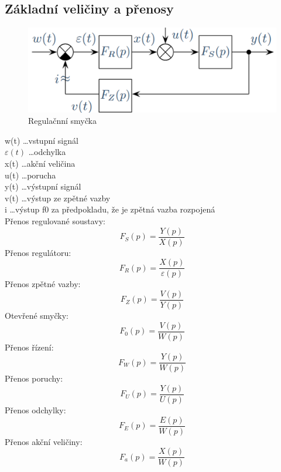 \subsection*{Základní veličiny a přenosy}
\begin{figure}[H]
    \includegraphics[scale = 0.45]{images/reg.soustava2.png}
    \caption{Regulačnní smyčka}
\end{figure}
w(t) \dots vstupní signál \\
$\varepsilon(t)$ \dots odchylka \\
x(t) \dots akční veličina \\
u(t) \dots porucha \\
y(t) \dots výstupní signál\\
v(t) \dots výstup ze zpětné vazby\\
i    \dots výstup f0 za předpokladu, že je zpětná vazba rozpojená\\

\noindent
Přenos regulované soustavy:
\begin{equation}
    F_S(p) = \frac{Y(p)}{X(p)}
\end{equation}
Přenos regulátoru:
\begin{equation}
    F_R(p) = \frac{X(p)}{\varepsilon(p)}
\end{equation}
Přenos zpětné vazby:
\begin{equation}
    F_Z(p) = \frac{V(p)}{Y(p)}
\end{equation}
Otevřené smyčky:
\begin{equation}
    F_0(p) = \frac{V(p)}{W(p)} %
\end{equation}
Přenos řízení:
\begin{equation}
    F_W(p) = \frac{Y(p)}{W(p)}
\end{equation}
Přenos poruchy:
\begin{equation}
    F_U(p) = \frac{Y(p)}{U(p)}
\end{equation}
Přenos odchylky:
\begin{equation}
    F_E(p)=\frac{E(p)}{W(p)}
\end{equation}
Přenos akční veličiny:
\begin{equation}
    F_a(p) = \frac{X(p)}{W(p)}
\end{equation}
